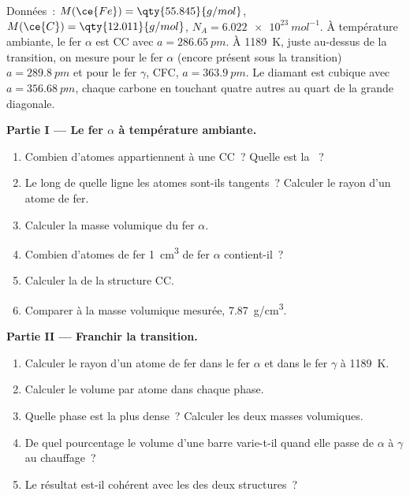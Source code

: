 \begin{problem}
\label{pb:b1:crystals-metals:1}
Données~: $M(\ce{Fe}) = \qty{55.845}{g/mol}$, $M(\ce{C}) = \qty{12.011}{g/mol}$,
$N_A = \qty{6.022e23}{mol^{-1}}$. À température ambiante, le fer
$\alpha$ est CC avec $a = \qty{286.65}{pm}$. À \qty{1189}{K}, juste
au-dessus de la transition, on mesure pour le fer $\alpha$ (encore
présent sous la transition) $a = \qty{289.8}{pm}$ et pour le fer
$\gamma$, CFC, $a = \qty{363.9}{pm}$. Le diamant est cubique avec
$a = \qty{356.68}{pm}$, chaque carbone en touchant quatre autres au
quart de la grande diagonale.

\medskip
\noindent\textbf{Partie I --- Le fer $\alpha$ à température ambiante.}
\begin{enumerate}
  \item Combien d'atomes appartiennent à une  CC~? Quelle est la
        ~?
  \item Le long de quelle ligne les atomes sont-ils tangents~? Calculer
        le rayon d'un atome de fer.
  \item Calculer la masse volumique du fer $\alpha$.
  \item Combien d'atomes de fer \qty{1}{cm^3} de fer $\alpha$
        contient-il~?
  \item Calculer la  de la structure CC.
  \item Comparer à la masse volumique mesurée, \qty{7.87}{g/cm^3}.
\end{enumerate}

\medskip
\noindent\textbf{Partie II --- Franchir la transition.}
\begin{enumerate}[resume]
  \item Calculer le rayon d'un atome de fer dans le fer $\alpha$ et dans
        le fer $\gamma$ à \qty{1189}{K}.
  \item Calculer le volume par atome dans chaque phase.
  \item Quelle phase est la plus dense~? Calculer les deux masses
        volumiques.
  \item De quel pourcentage le volume d'une barre varie-t-il quand elle
        passe de $\alpha$ à $\gamma$ au chauffage~?
  \item Le résultat est-il cohérent avec les  des deux
        structures~?
\end{enumerate}


\end{problem}
